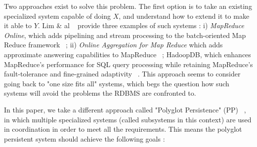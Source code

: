 Two approaches exist to solve this problem. The first option is to take an existing specialized system capable of doing $X$, and understand how to extend it to make it able to $Y$. Lim \& al ~\cite{Lim2013} provide three examples of such systems : i) \emph{MapReduce Online}, which adds pipelining and stream processing to the batch-oriented Map Reduce framework ~\cite{Condie2010}; ii) \emph{Online Aggregation for Map Reduce} which adds approximate answering capabilities to MapReduce ~\cite{Pansare2011}; HadoopDB, which enhances MapReduce's performance for SQL query processing while retaining MapReduce's fault-tolerance and fine-grained adaptivity ~\cite{Abouzeid2009}. This approach seems to consider going back to "one size fits all" systems, which begs the question how such systems will avoid the problems the RDBMS are confronted to.


In this paper, we take a different approach called "Polyglot Persistence" (PP) ~\cite{Fowler2012},  in which multiple specialized systems (called subsystems in this context) are used in coordination in order to meet all the requirements. This means the polyglot persistent system should achieve the following goals :

